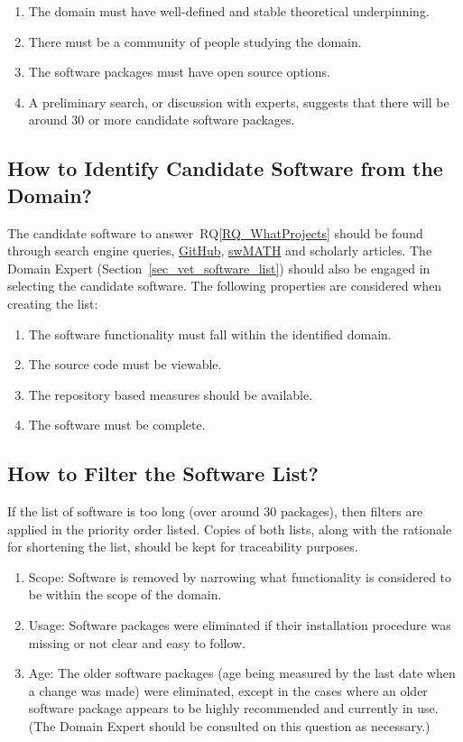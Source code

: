 \documentclass[runningheads]{llncs}
\newcommand{\rqref}[1]{RQ\ref{#1}}
\begin{document}
\begin{enumerate}
\item The domain must have well-defined and stable theoretical underpinning.
\item There must be a community of people studying the domain.
\item The software packages must have open source options.
\item A preliminary search, or discussion with experts, suggests that there will
  be around 30 or more candidate software packages.
\end{enumerate}	

\subsection{How to Identify Candidate Software from the Domain?}
\label{identifysoftware}

The candidate software to answer~\rqref{RQ_WhatProjects} should be found through
search engine queries,  
\href{https://github.com/} {GitHub}, \href{https://swmath.org/} {swMATH}
and scholarly articles. The Domain Expert (Section~\ref{sec_vet_software_list})
should also be engaged in selecting the candidate software.  The following
properties are considered when creating the list:

\begin{enumerate}
	\item The software functionality must fall within the identified domain.
	\item The source code must be viewable.
	\item The repository based measures should be available.
	\item The software must be complete.
\end{enumerate}

\subsection{How to Filter the Software List?} \label{filtersoftware}

If the list of software is too long (over around 30 packages), then filters are
applied in the priority order listed. Copies of both lists, along with the
rationale for shortening the list, should be kept for traceability purposes.

\begin{enumerate}
	\item Scope: Software is removed by narrowing what functionality is
	considered to be within the scope of the domain.
	\item Usage: Software packages were eliminated if their installation
	procedure was missing or not clear and easy to follow.
	\item Age: The older software packages (age being measured by the last date
	when a change was made) were eliminated, except in the cases where an older
	software package appears to be highly recommended and currently in use. (The
	Domain Expert should be consulted on this question as necessary.)
\end{enumerate}
\end{document}

